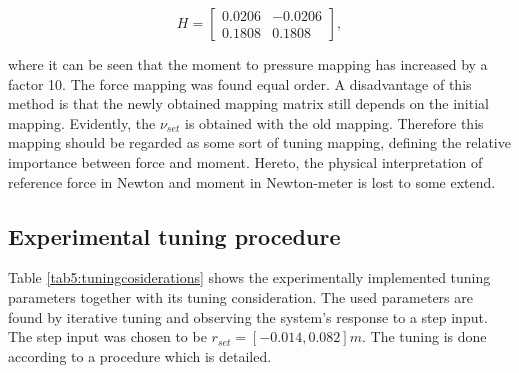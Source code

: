 \begin{equation}
    H = \begin{bmatrix} 	0.0206 &  -0.0206 \\ 
	0.1808 & 0.1808 \end{bmatrix},
    \label{eq4:revisedH}
\end{equation}

where it can be seen that the moment to pressure mapping has increased by a factor 10. The force mapping was found equal order. A disadvantage of this method is that the newly obtained mapping matrix still depends on the initial mapping. Evidently, the $\nu_{set}$ is obtained with the old mapping. Therefore this mapping should be regarded as some sort of tuning mapping, defining the relative importance between force and moment. Hereto, the physical interpretation of reference force in Newton and moment in Newton-meter is lost to some extend. 

\subsection*{Experimental tuning procedure}


Table \ref{tab5:tuningcosiderations} shows the experimentally implemented tuning parameters together with its tuning consideration. The used parameters are found by iterative tuning and observing the system's response to a step input. The step input was chosen to be $r_{set} = [-0.014,0.082]m$. The tuning is done according to a procedure which is detailed.


